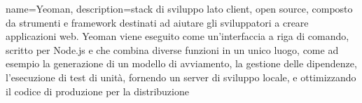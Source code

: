 

{
	name=Yeoman,
	description={stack di sviluppo lato client, open source, composto da strumenti e framework destinati ad aiutare gli sviluppatori a creare applicazioni web. Yeoman viene eseguito come un'interfaccia a riga di comando, scritto per Node.js e che combina diverse funzioni in un unico luogo, come ad esempio la generazione di un modello di avviamento, la gestione delle dipendenze, l'esecuzione di test di unità, fornendo un server di sviluppo locale, e ottimizzando il codice di produzione per la distribuzione}
}

